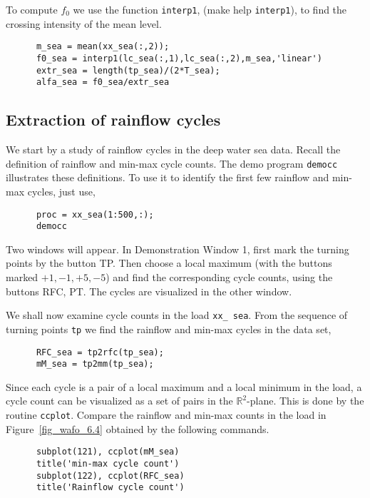To compute $f_0$ we use the \ML{} function
{\tt interp1}, (make help {\tt interp1}), to find the crossing intensity
of the mean level.
{\small\begin{verbatim}
      m_sea = mean(xx_sea(:,2));
      f0_sea = interp1(lc_sea(:,1),lc_sea(:,2),m_sea,'linear')
      extr_sea = length(tp_sea)/(2*T_sea);
      alfa_sea = f0_sea/extr_sea
\end{verbatim}}

\subsection{Extraction of rainflow cycles}
\label{sec:rainflowextraction}

We start by a study of rainflow cycles in the deep water sea data.
Recall the  definition of rainflow and min-max cycle counts.
The demo program \verb|democc| illustrates these definitions.
To use it to identify the first few rainflow and
min-max cycles, just use,
{\small\begin{verbatim}
      proc = xx_sea(1:500,:);
      democc
\end{verbatim}} 

Two windows will appear. In Demonstration Window 1, first mark the
turning points by the button TP. Then choose a local maximum (with the
buttons marked $+1,-1,+5,-5$) and find
the corresponding cycle counts, using the buttons RFC, PT. The cycles
are visualized in the other window.

We shall now examine cycle counts in the load {\tt xx\_\,sea}.
From the sequence of turning points \verb|tp| we find the rainflow
and min-max cycles in the data set,
{\small\begin{verbatim}
      RFC_sea = tp2rfc(tp_sea);
      mM_sea = tp2mm(tp_sea);
\end{verbatim}} 
Since each cycle is a pair of a local maximum and a local minimum in the
load, a cycle count can be visualized as a set of pairs in the
$\mathbb{R}^2$-plane. This is done by
the routine \verb+ccplot+. 
Compare the rainflow and min-max counts in the load in
Figure~\ref{fig_wafo_6.4} obtained by the following commands.
{\small \begin{verbatim}
      subplot(121), ccplot(mM_sea)
      title('min-max cycle count')
      subplot(122), ccplot(RFC_sea)
      title('Rainflow cycle count')
\end{verbatim}}

